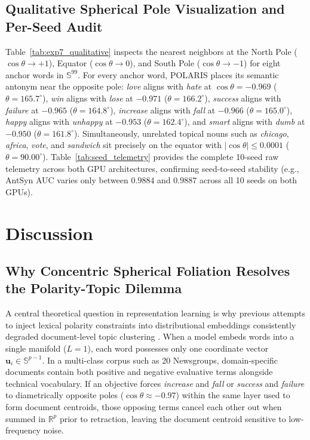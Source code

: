 \documentclass[journal]{IEEEtran}
\begin{document}
\subsection{Qualitative Spherical Pole Visualization and Per-Seed Audit}
Table~\ref{tab:exp7_qualitative} inspects the nearest neighbors at the North Pole ($\cos\theta \to +1$), Equator ($\cos\theta \to 0$), and South Pole ($\cos\theta \to -1$) for eight anchor words in $\mathbb{S}^{99}$. For every anchor word, POLARIS places its semantic antonym near the opposite pole: \textit{love} aligns with \textit{hate} at $\cos\theta = -0.969$ ($\theta = 165.7^\circ$), \textit{win} aligns with \textit{lose} at $-0.971$ ($\theta = 166.2^\circ$), \textit{success} aligns with \textit{failure} at $-0.965$ ($\theta = 164.8^\circ$), \textit{increase} aligns with \textit{fall} at $-0.966$ ($\theta = 165.0^\circ$), \textit{happy} aligns with \textit{unhappy} at $-0.953$ ($\theta = 162.4^\circ$), and \textit{smart} aligns with \textit{dumb} at $-0.950$ ($\theta = 161.8^\circ$). Simultaneously, unrelated topical nouns such as \textit{chicago}, \textit{africa}, \textit{vote}, and \textit{sandwich} sit precisely on the equator with $|\cos\theta| \le 0.0001$ ($\theta = 90.00^\circ$). Table~\ref{tab:seed_telemetry} provides the complete 10-seed raw telemetry across both GPU architectures, confirming seed-to-seed stability (e.g., AntSyn AUC varies only between $0.9884$ and $0.9887$ across all 10 seeds on both GPUs).

\section{Discussion}

\subsection{Why Concentric Spherical Foliation Resolves the Polarity-Topic Dilemma}
A central theoretical question in representation learning is why previous attempts to inject lexical polarity constraints into distributional embeddings consistently degraded document-level topic clustering \cite{mrksic2017semantic}. When a model embeds words into a single manifold ($L=1$), each word possesses only one coordinate vector $\mathbf{u}_i \in \mathbb{S}^{p-1}$. In a multi-class corpus such as 20 Newsgroups, domain-specific documents contain both positive and negative evaluative terms alongside technical vocabulary. If an objective forces \textit{increase} and \textit{fall} or \textit{success} and \textit{failure} to diametrically opposite poles ($\cos\theta \approx -0.97$) within the same layer used to form document centroids, those opposing terms cancel each other out when summed in $\mathbb{R}^p$ prior to retraction, leaving the document centroid sensitive to low-frequency noise.
\end{document}
